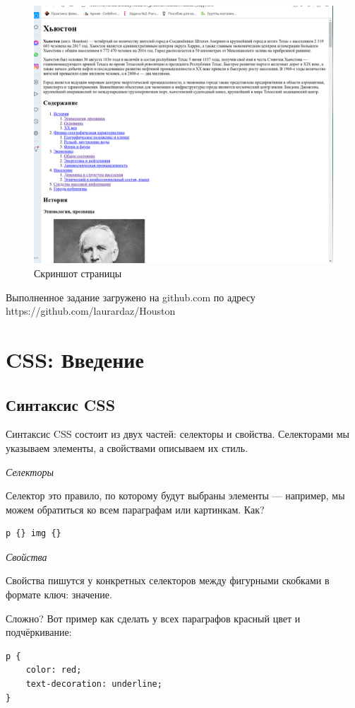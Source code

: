 \documentclass[14pt]{extreport}
\begin{document}
\begin{figure}[H]
\centerline{\includegraphics[width=0.7\linewidth]{pics_practice/houston.png}}
\caption{Скриншот страницы}
\label{6}
\end{figure}

Выполненное задание загружено на github.com по адресу https://github.com/laurardaz/Houston




\chapter{CSS: Введение}
\section{Синтаксис CSS}

Синтаксис CSS состоит из двух частей: селекторы и свойства. Селекторами мы указываем элементы, а свойствами описываем их стиль.

\emph{Селекторы}

Селектор это правило, по которому будут выбраны элементы — например, мы можем обратиться ко всем параграфам или картинкам. Как?
\begin{verbatim}
p {} img {}
\end{verbatim}

\emph{Свойства}

Свойства пишутся у конкретных селекторов между фигурными скобками в формате ключ: значение.

Сложно? Вот пример как сделать у всех параграфов красный цвет и подчёркивание:
\begin{verbatim}
p {
    color: red;
    text-decoration: underline;
}
\end{verbatim}
\end{document}
